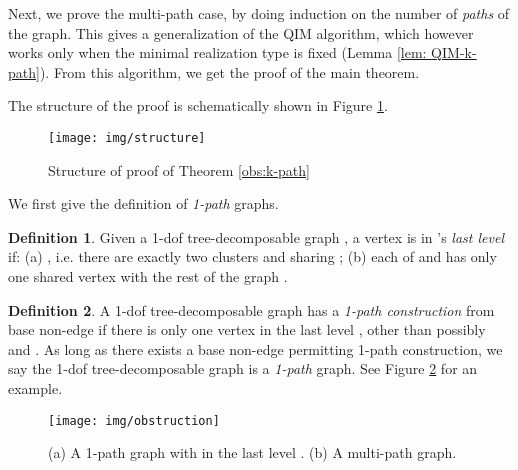 \documentclass[secthm,amsthm,english]{article}
\theoremstyle{definition}
\newtheorem{definition}{Definition}
\theoremstyle{remark}
\begin{document}
Next, we prove the multi-path case, by doing induction on the number of \emph{paths} of the graph. 
This gives a generalization of the QIM algorithm, which however works only when the minimal realization type is fixed (Lemma \ref{lem: QIM-k-path}). 
From this algorithm, we get the proof of the main theorem. 

The structure of the proof is schematically shown in Figure \ref{F:structure}. 



\begin{figure}[h] 
	  
  
	
	\begin{centering}
	\texttt{[image: img/structure]} 
	\par\end{centering}
	
	\caption{Structure of proof of Theorem \ref{obs:k-path}}
	
\label{F:structure}
\end{figure}


\noindent We first give the definition of \emph{1-path} graphs. 

\begin{definition} \label{def:last-level} 
Given a 1-dof tree-decomposable graph , 
a vertex  is in 's {\emph{last level} } if: 
(a) , i.e. there are exactly two clusters  and  sharing ; 
(b) each of  and  has only one shared vertex with the rest of the graph 
. 
\end{definition}



\begin{definition}\label{def:1-path}
A 1-dof tree-decomposable graph  has a {\emph{1-path construction}} from base non-edge  
if there is only one vertex  in the last level , other than possibly  and . 
As long as there exists a base non-edge permitting 1-path construction, we say the 1-dof tree-decomposable
graph  is a {\emph{1-path}} graph. See Figure \ref{F:obstruction} for an example. 
\end{definition}

\begin{figure}[h]
	 
	  
	   
	  
	
	\begin{centering}
	\texttt{[image: img/obstruction]} 
	\par\end{centering}
	
	\caption{(a) A 1-path graph with  in the last level . (b) A multi-path graph.}
\label{F:obstruction} 
\end{figure}
\end{document}
